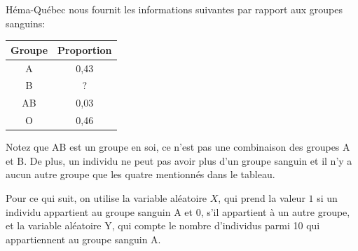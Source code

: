 \begin{questions}
\begin{parts}
\end{parts}

\newpage

\question\label{cable} Héma-Québec nous fournit les informations suivantes par rapport aux groupes sanguins:

\medskip

\begin{table}[h]
    \centering
\begin{tabular}{|c|c|}
\hline
    Groupe & Proportion\\
    \hline
     A&  0,43\\
     B& ?\\
     AB& 0,03 \\
     O& 0,46\\
     \hline
\end{tabular}
    \label{tab:my_label}
\end{table}

Notez que AB est un groupe en soi, ce n'est pas une combinaison des groupes A et B. De plus, un individu ne peut pas avoir plus d'un groupe sanguin et il n'y a aucun autre groupe que les quatre mentionnés dans le tableau.


Pour ce qui suit, on utilise la variable aléatoire $X$, qui prend la valeur $1$ si un individu appartient au groupe sanguin A et $0$, s'il appartient à un autre groupe, et la variable aléatoire Y, qui compte le nombre d'individus parmi 10 qui appartiennent au groupe sanguin A.
\end{questions}
